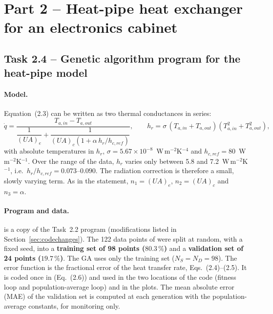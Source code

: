 \section{Part 2 -- Heat-pipe heat exchanger for an electronics cabinet}
\label{sec:part2}

\subsection{Task 2.4 -- Genetic algorithm program for the heat-pipe model}
\label{sec:t24}

\paragraph{Model.}
Equation~(2.3) can be written as two thermal conductances in series:
\begin{equation}
\dot q=\frac{T_{a,in}-T_{a,out}}{\dfrac{1}{(UA)_e}+\dfrac{1}{(UA)_c\left(1+\alpha\,h_r/h_{c,ref}\right)}},\qquad
h_r=\sigma\,(T_{a,in}+T_{a,out})(T_{a,in}^2+T_{a,out}^2),
\label{eq:hp}
\end{equation}
with absolute temperatures in $h_r$, $\sigma=5.67\times10^{-8}$~W\,m$^{-2}$K$^{-4}$ and
$h_{c,ref}=80$~W\,m$^{-2}$K$^{-1}$. Over the range of the data, $h_r$ varies only between 5.8 and
7.2~W\,m$^{-2}$K$^{-1}$, i.e.\ $h_r/h_{c,ref}=0.073$--$0.090$. The radiation correction is therefore a
small, slowly varying term. As in the statement, $n_1=(UA)_e$, $n_2=(UA)_c$ and $n_3=\alpha$.

\paragraph{Program and data.}
 is a copy of the Task~2.2 program (modifications listed in
Section~\ref{sec:codechanges}). The 122 data points of  were split at random, with a
fixed seed, into a \textbf{training set of 98 points ($80.3\,\%$)} and a \textbf{validation set of 24
points ($19.7\,\%$)}. The GA uses only the training set ($N_S=N_D=98$). The error function is the
fractional error of the heat transfer rate, Eqs.~(2.4)--(2.5). It is coded once in 
(Eq.~(2.6)) and used in the two locations of the code (fitness loop and population-average loop) and in the
plots. The mean absolute error (MAE) of the validation set is computed at each generation with the
population-average constants, for monitoring only.

